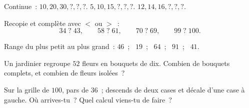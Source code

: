 \begin{exercise}[$\star$]\label{exo:g1:tens:5}
Continue~: $10, 20, 30, ?, ?, ?$. \quad
$5, 10, 15, ?, ?, ?$. \quad $12, 14, 16, ?, ?, ?$.
\end{exercise}

\begin{exercise}[$\star$]\label{exo:g1:tens:6}
Recopie et complète avec $<$ ou $>$~:
\[
34 \;?\; 43, \qquad
58 \;?\; 61, \qquad
70 \;?\; 69, \qquad
99 \;?\; 100 .
\]
\end{exercise}

\begin{exercise}[$\star$]\label{exo:g1:tens:7}
Range du plus petit au plus grand~: $46$~; \ $19$~; \ $64$~; \
$91$~; \ $41$.
\end{exercise}

\begin{exercise}[$\star$]\label{exo:g1:tens:8}
Un jardinier regroupe $52$ fleurs en bouquets de dix. Combien de
bouquets complets, et combien de fleurs isolées~?
\end{exercise}

\begin{exercise}[$\star\star$]\label{exo:g1:tens:9}
Sur la grille de $100$, pars de $36$~; descends de deux cases et
décale d'une case à gauche. Où arrives-tu~? Quel calcul
viens-tu de faire~?
\end{exercise}
